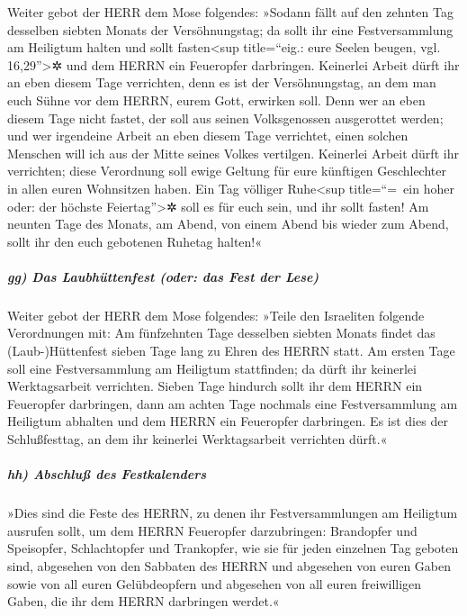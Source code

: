 Weiter gebot der HERR dem Mose folgendes:
»Sodann fällt auf den zehnten Tag desselben siebten
Monats der Versöhnungstag; da sollt ihr eine Festversammlung am
Heiligtum halten und sollt fasten\textless sup title=``eig.: eure Seelen
beugen, vgl. 16,29''\textgreater✲ und dem HERRN ein Feueropfer
darbringen. Keinerlei Arbeit dürft ihr an eben diesem
Tage verrichten, denn es ist der Versöhnungstag, an dem man euch Sühne
vor dem HERRN, eurem Gott, erwirken soll. Denn wer an
eben diesem Tage nicht fastet, der soll aus seinen Volksgenossen
ausgerottet werden; und wer irgendeine Arbeit an eben
diesem Tage verrichtet, einen solchen Menschen will ich aus der Mitte
seines Volkes vertilgen. Keinerlei Arbeit dürft ihr
verrichten; diese Verordnung soll ewige Geltung für eure künftigen
Geschlechter in allen euren Wohnsitzen haben. Ein Tag
völliger Ruhe\textless sup title=``=~ein hoher oder: der höchste
Feiertag''\textgreater✲ soll es für euch sein, und ihr sollt fasten! Am
neunten Tage des Monats, am Abend, von einem Abend bis wieder zum Abend,
sollt ihr den euch gebotenen Ruhetag halten!«

\hypertarget{gg-das-laubhuxfcttenfest-oder-das-fest-der-lese}{%
\subparagraph{gg) Das Laubhüttenfest (oder: das Fest der
Lese)}\label{gg-das-laubhuxfcttenfest-oder-das-fest-der-lese}}

Weiter gebot der HERR dem Mose folgendes:
»Teile den Israeliten folgende Verordnungen mit: Am
fünfzehnten Tage desselben siebten Monats findet das (Laub-)Hüttenfest
sieben Tage lang zu Ehren des HERRN statt. Am ersten Tage
soll eine Festversammlung am Heiligtum stattfinden; da dürft ihr
keinerlei Werktagsarbeit verrichten. Sieben Tage hindurch
sollt ihr dem HERRN ein Feueropfer darbringen, dann am achten Tage
nochmals eine Festversammlung am Heiligtum abhalten und dem HERRN ein
Feueropfer darbringen. Es ist dies der Schlußfesttag, an dem ihr
keinerlei Werktagsarbeit verrichten dürft.«

\hypertarget{hh-abschluuxdf-des-festkalenders}{%
\subparagraph{hh) Abschluß des
Festkalenders}\label{hh-abschluuxdf-des-festkalenders}}

»Dies sind die Feste des HERRN, zu denen ihr
Festversammlungen am Heiligtum ausrufen sollt, um dem HERRN Feueropfer
darzubringen: Brandopfer und Speisopfer, Schlachtopfer und Trankopfer,
wie sie für jeden einzelnen Tag geboten sind, abgesehen
von den Sabbaten des HERRN und abgesehen von euren Gaben sowie von all
euren Gelübdeopfern und abgesehen von all euren freiwilligen Gaben, die
ihr dem HERRN darbringen werdet.«

